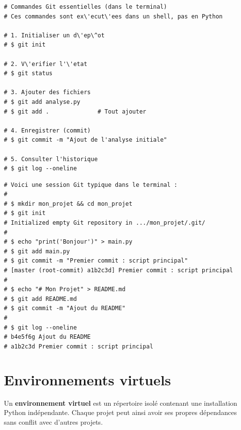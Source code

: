 \begin{codeblock}[title=\textbf{Python}]
\begin{verbatim}
# Commandes Git essentielles (dans le terminal)
# Ces commandes sont ex\'ecut\'ees dans un shell, pas en Python

# 1. Initialiser un d\'ep\^ot
# $ git init

# 2. V\'erifier l'\'etat
# $ git status

# 3. Ajouter des fichiers
# $ git add analyse.py
# $ git add .              # Tout ajouter

# 4. Enregistrer (commit)
# $ git commit -m "Ajout de l'analyse initiale"

# 5. Consulter l'historique
# $ git log --oneline
\end{verbatim}
\end{codeblock}

\begin{exemple}
\begin{codeblock}[title=\textbf{Python}]
\begin{verbatim}
# Voici une session Git typique dans le terminal :
#
# $ mkdir mon_projet && cd mon_projet
# $ git init
# Initialized empty Git repository in .../mon_projet/.git/
#
# $ echo "print('Bonjour')" > main.py
# $ git add main.py
# $ git commit -m "Premier commit : script principal"
# [master (root-commit) a1b2c3d] Premier commit : script principal
#
# $ echo "# Mon Projet" > README.md
# $ git add README.md
# $ git commit -m "Ajout du README"
#
# $ git log --oneline
# b4e5f6g Ajout du README
# a1b2c3d Premier commit : script principal
\end{verbatim}
\end{codeblock}
\end{exemple}

\section{Environnements virtuels}

\begin{definition}
Un \textbf{environnement virtuel} est un r\'epertoire isol\'e contenant une installation
Python ind\'ependante. Chaque projet peut ainsi avoir ses propres d\'ependances sans
conflit avec d'autres projets.
\end{definition}

